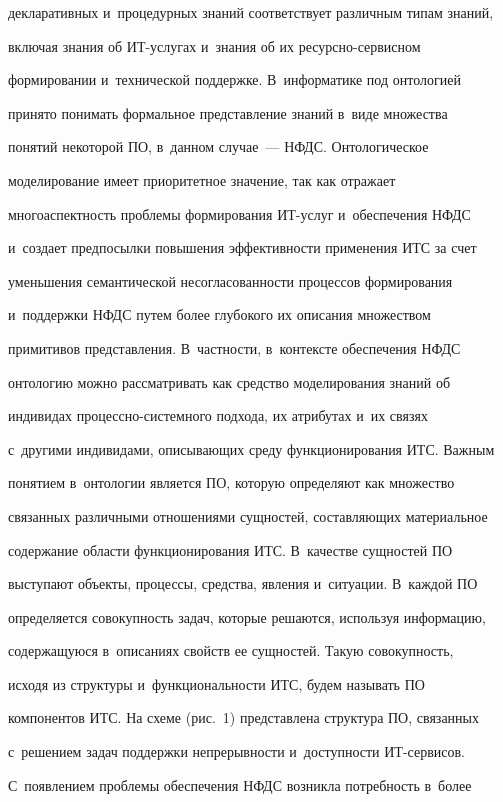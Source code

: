 декларативных и~процедурных знаний соответствует различным типам знаний,


включая знания об ИТ-услу\-гах и~знания об их ре\-сурс\-но-сер\-вис\-ном


формировании и~технической поддержке. В~информатике под онтологией


принято понимать формальное представление знаний в~виде множества


понятий некоторой ПО, в~данном случае~--- НФДС. Онтологическое


моделирование имеет приоритетное значение, так как отражает


многоаспектность проблемы формирования ИТ-услуг и~обеспечения НФДС


и~создает предпосылки повышения эффективности применения ИТС за счет


уменьшения семантической несогласованности процессов формирования


и~поддержки НФДС путем более глубокого их описания множеством


примитивов представления. В~част\-ности, в~контексте обеспечения НФДС


онтологию можно рассматривать как средство моделирования знаний об


индивидах про\-цес\-сно-сис\-тем\-но\-го подхода, их атрибутах и~их связях


с~другими индивидами, описывающих среду функционирования ИТС. Важным


понятием в~онтологии является ПО, которую определяют как множество


связанных различными отношениями сущностей, составляющих материальное


содержание области функционирования ИТС. В~качестве сущностей ПО


выступают объекты, процессы, средства, явления и~ситуации. В~каж\-дой ПО


определяется совокупность задач, которые решаются, используя информацию,


содержащуюся в~описаниях свойств ее сущностей. Такую совокупность,


исходя из структуры и~функциональности ИТС, будем называть ПО


компонентов ИТС. На схеме (рис.~1) представлена структура ПО, связанных


с~решением задач поддержки непрерывности и~доступности ИТ-сер\-ви\-сов.


С~появлением проблемы обеспечения НФДС возникла потребность в~более


